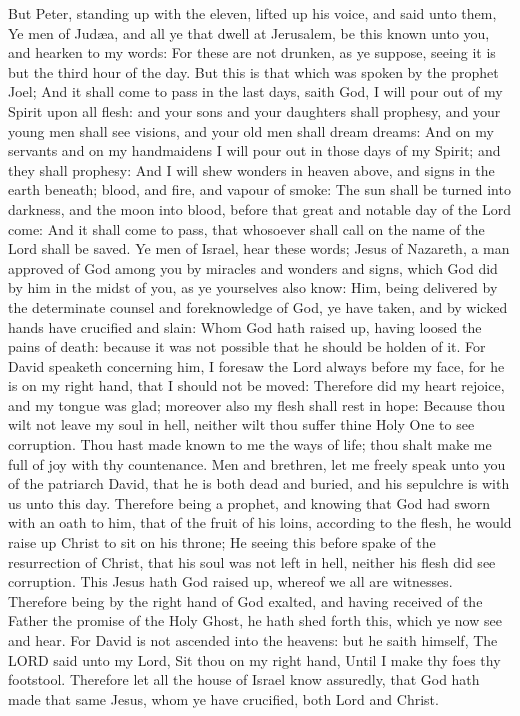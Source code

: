  But Peter, standing up with the eleven, lifted up his
voice, and said unto them, Ye men of Judæa, and all ye that dwell at
Jerusalem, be this known unto you, and hearken to my words:
 For these are not drunken, as ye suppose, seeing it is
but the third hour of the day.  But this is that which
was spoken by the prophet Joel;  And it shall come to
pass in the last days, saith God, I will pour out of my Spirit upon all
flesh: and your sons and your daughters shall prophesy, and your young
men shall see visions, and your old men shall dream dreams:
 And on my servants and on my handmaidens I will pour out
in those days of my Spirit; and they shall prophesy:  And
I will shew wonders in heaven above, and signs in the earth beneath;
blood, and fire, and vapour of smoke:  The sun shall be
turned into darkness, and the moon into blood, before that great and
notable day of the Lord come:  And it shall come to pass,
that whosoever shall call on the name of the Lord shall be saved.
 Ye men of Israel, hear these words; Jesus of Nazareth, a
man approved of God among you by miracles and wonders and signs, which
God did by him in the midst of you, as ye yourselves also know:
 Him, being delivered by the determinate counsel and
foreknowledge of God, ye have taken, and by wicked hands have crucified
and slain:  Whom God hath raised up, having loosed the
pains of death: because it was not possible that he should be holden of
it.  For David speaketh concerning him, I foresaw the
Lord always before my face, for he is on my right hand, that I should
not be moved:  Therefore did my heart rejoice, and my
tongue was glad; moreover also my flesh shall rest in hope:
 Because thou wilt not leave my soul in hell, neither
wilt thou suffer thine Holy One to see corruption.  Thou
hast made known to me the ways of life; thou shalt make me full of joy
with thy countenance.  Men and brethren, let me freely
speak unto you of the patriarch David, that he is both dead and buried,
and his sepulchre is with us unto this day.  Therefore
being a prophet, and knowing that God had sworn with an oath to him,
that of the fruit of his loins, according to the flesh, he would raise
up Christ to sit on his throne;  He seeing this before
spake of the resurrection of Christ, that his soul was not left in hell,
neither his flesh did see corruption.  This Jesus hath
God raised up, whereof we all are witnesses.  Therefore
being by the right hand of God exalted, and having received of the
Father the promise of the Holy Ghost, he hath shed forth this, which ye
now see and hear.  For David is not ascended into the
heavens: but he saith himself, The LORD said unto my Lord, Sit thou on
my right hand,  Until I make thy foes thy footstool.
 Therefore let all the house of Israel know assuredly,
that God hath made that same Jesus, whom ye have crucified, both Lord
and Christ.


